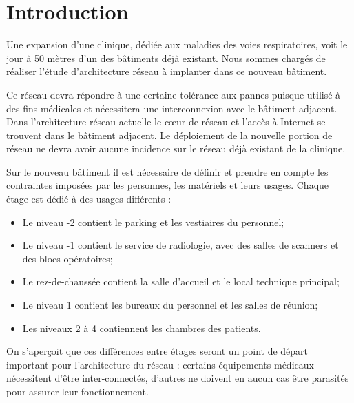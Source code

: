 \section*{Introduction} %

%
%

Une expansion d'une clinique, dédiée aux maladies des voies respiratoires, voit le jour à 50 mètres d'un des bâtiments déjà existant.
Nous sommes chargés de réaliser l'étude d'architecture réseau à implanter dans ce nouveau bâtiment.

%
%

Ce réseau devra répondre à une certaine tolérance aux pannes puisque utilisé à des fins médicales et nécessitera une interconnexion avec le bâtiment adjacent.
Dans l'architecture réseau actuelle le cœur de réseau et l'accès à Internet se trouvent dans le bâtiment adjacent.
Le déploiement de la nouvelle portion de réseau ne devra avoir aucune incidence sur le réseau déjà existant de la clinique.

%
%

Sur le nouveau bâtiment il est nécessaire de définir et prendre en compte les contraintes imposées par les personnes, les matériels et leurs usages.
Chaque étage est dédié à des usages différents :
\begin{itemize}
\item Le niveau -2 contient le parking et les vestiaires du personnel;
\item Le niveau -1 contient le service de radiologie, avec des salles de scanners et des blocs opératoires;
\item Le rez-de-chaussée contient la salle d'accueil et le local technique principal;
\item Le niveau 1 contient les bureaux du personnel et les salles de réunion;
\item Les niveaux 2 à 4 contiennent les chambres des patients.
\end{itemize}
On s'aperçoit que ces différences entre étages seront un point de départ important pour l'architecture du réseau :
certains équipements médicaux nécessitent d'être inter-connectés, d'autres ne doivent en aucun cas être parasités pour assurer leur fonctionnement.

%
%
